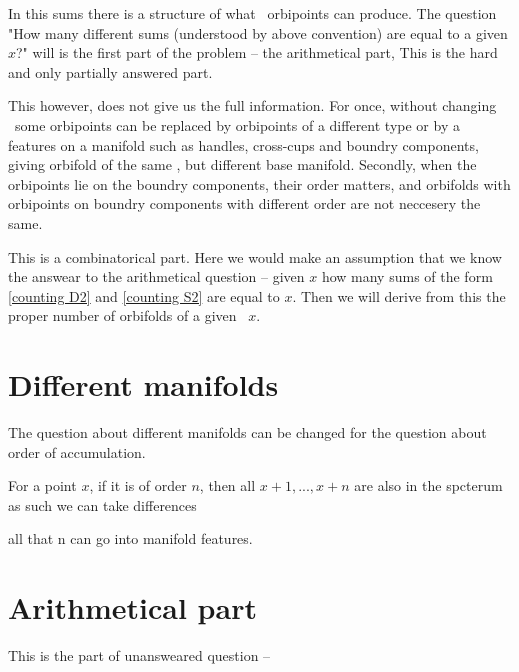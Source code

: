 In this sums there is a structure of what \Eoc\ orbipoints can produce. 
The question "How many different sums (understood by above convention) are equal to a given $x$?" 
will is the first part of the problem -- the arithmetical part, 
This is the hard and only partially answered part.

This however, does not give us the full information. For once, without changing \Eoc\ some 
orbipoints can be replaced 
by orbipoints of a different type or 
by a features on a manifold such as handles, cross-cups and 
boundry components, giving orbifold of the same \Eoc, but different base manifold. 
Secondly, when the orbipoints lie on the boundry components, their 
order matters, and orbifolds with orbipoints on boundry components with different order 
are not neccesery the same. 

This is a combinatorical part. Here we would make an assumption that we know 
the answear to the arithmetical question -- given $x$ how many sums of the form 
\ref{counting D2} and \ref{counting S2} are equal to $x$. Then we will derive from 
this the proper number of orbifolds of a given \Eoc\ $x$. 
\section{Different manifolds}\label{conting_diff_man}
The question about different manifolds can be changed for the question about order of 
accumulation. 

For a point $x$, if it is of order $n$, then all $x+1,...,x+n$ are also in the spcterum
as such we can take differences

all that n can go into manifold features.
 


\section{Arithmetical part}\label{conting_arithmetical}
This is the part of unansweared question --

